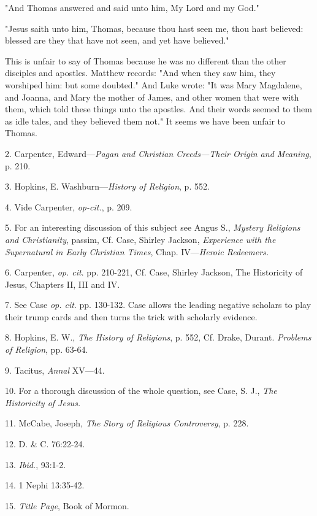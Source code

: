 "And Thomas answered and said unto him, My Lord and my God."

"Jesus saith unto him, Thomas, because thou hast seen me, thou hast believed: blessed are
they that have not seen, and yet have believed."

This is unfair to say of Thomas because he was no different than the other disciples and
apostles. Matthew records: "And when they saw him, they worshiped him: but some
doubted." And Luke wrote: "It was Mary Magdalene, and Joanna, and Mary the mother of
James, and other women that were with them, which told these things unto the apostles. And
their words seemed to them as idle tales, and they believed them not." It seems we have been
unfair to Thomas.

2. Carpenter, Edward—\textit{Pagan and Christian Creeds—Their Origin and Meaning}, p. 210.

3. Hopkins, E. Washburn—\textit{History of Religion}, p. 552.

4. Vide Carpenter, \textit{op-cit.}, p. 209.

5. For an interesting discussion of this subject see Angus S., \textit{Mystery Religions and
Christianity}, passim, Cf. Case, Shirley Jackson, \textit{Experience with the Supernatural in Early
Christian Times}, Chap. IV—\textit{Heroic Redeemers.}

6. Carpenter, \textit{op. cit}. pp. 210-221, Cf. Case, Shirley Jackson, The Historicity of Jesus,
Chapters II, III and IV.

7. See Case \textit{op. cit}. pp. 130-132. Case allows the leading negative scholars to play their
trump cards and then turns the trick with scholarly evidence.

8. Hopkins, E. W., \textit{The History of Religions}, p. 552, Cf. Drake, Durant. \textit{Problems of Religion},
pp. 63-64.

9. Tacitus, \textit{Annal} XV—44.

10. For a thorough discussion of the whole question, see Case, S. J., \textit{The Historicity of Jesus.}

11. McCabe, Joseph, \textit{The Story of Religious Controversy}, p. 228.

12. D. \& C. 76:22-24.

13. \textit{Ibid.}, 93:1-2.

14. 1 Nephi 13:35-42.

15. \textit{Title Page}, Book of Mormon.

